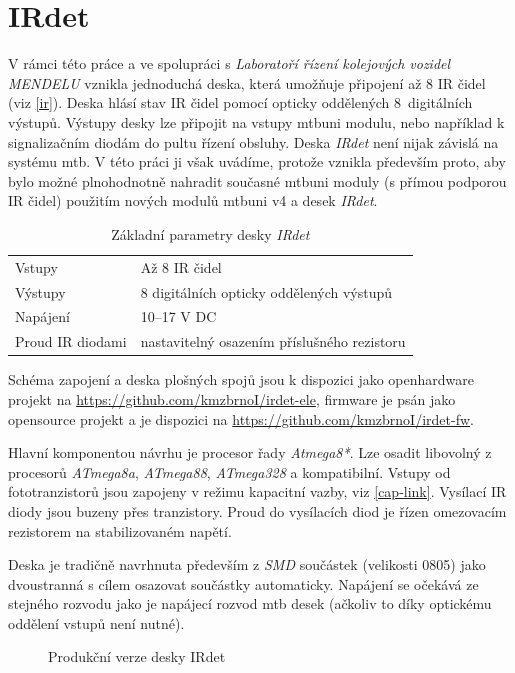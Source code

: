 \section{IRdet}

V rámci této práce a ve spolupráci s \textit{Laboratoří řízení kolejových
vozidel MENDELU} vznikla jednoduchá deska, která umožňuje připojení až 8 IR
čidel (viz \ref{ir}). Deska hlásí stav IR čidel pomocí opticky oddělených
8~digitálních výstupů. Výstupy desky lze připojit na vstupy \gls{mtbuni}
modulu, nebo například k signalizačním diodám do pultu řízení obsluhy.
Deska \textit{IRdet} není nijak závislá na systému \gls{mtb}. V této práci ji
však uvádíme, protože vznikla především proto, aby bylo možné plnohodnotně
nahradit současné \gls{mtbuni} moduly (s přímou podporou IR čidel) použitím
nových modulů \gls{mtbuni} v4 a desek \textit{IRdet}.

\begin{table}[h]
	\begin{tabularx}{\textwidth}{lX}
		\toprule
		Vstupy & Až 8 IR čidel \\
		Výstupy & 8 digitálních opticky oddělených výstupů \\
		Napájení & 10–17 V DC \\
		Proud IR diodami & nastavitelný osazením příslušného rezistoru \\
		\bottomrule
	\end{tabularx}
	\caption{Základní parametry desky \textit{IRdet}}
	\label{tab:mtbuni-params}
\end{table}

Schéma zapojení a deska plošných spojů jsou k dispozici jako openhardware
projekt na \url{https://github.com/kmzbrnoI/irdet-ele}, firmware je psán jako
opensource projekt a je dispozici na
\url{https://github.com/kmzbrnoI/irdet-fw}.

Hlavní komponentou návrhu je procesor řady \textit{Atmega8*}. Lze osadit
libovolný z procesorů \textit{ATmega8a}, \textit{ATmega88}, \textit{ATmega328}
a kompatibilní. Vstupy od fototranzistorů jsou zapojeny v režimu kapacitní
vazby, viz \ref{cap-link}. Vysílací IR diody jsou buzeny přes tranzistory.
Proud do vysílacích diod je řízen omezovacím rezistorem na stabilizovaném
napětí.

Deska je tradičně navrhnuta především z \textit{SMD} součástek (velikosti 0805)
jako dvoustranná s cílem osazovat součástky automaticky. Napájení se očekává
ze stejného rozvodu jako je napájecí rozvod \gls{mtb} desek (ačkoliv to díky
optickému oddělení vstupů není nutné).

\begin{figure}[ht]
\caption{Produkční verze desky IRdet}
\label{fig:irdet}
\end{figure}
